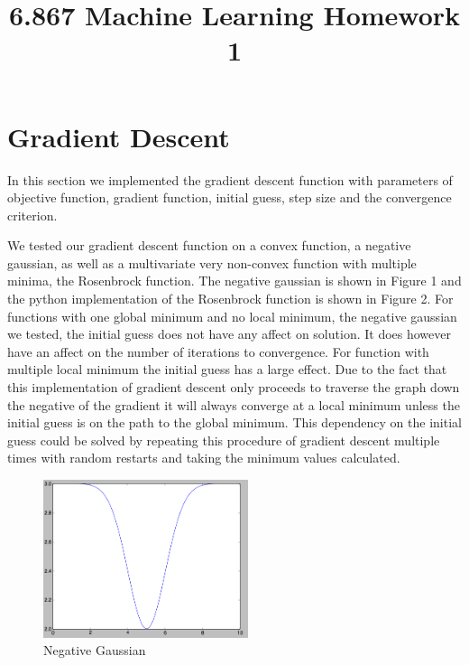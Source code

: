 \documentclass[pageno]{jpaper}
\begin{document}
\title{6.867 Machine Learning Homework 1}

\date{}
\maketitle

\thispagestyle{empty}


\section{Gradient Descent}

In this section we implemented the gradient descent function with parameters of objective function, gradient function, initial guess, step size and the convergence criterion.

We tested our gradient descent function on a convex function, a negative gaussian, as well as a multivariate very non-convex function with multiple minima, the Rosenbrock function. The negative gaussian is shown in Figure 1 and the python implementation of the Rosenbrock function is shown in Figure 2.
For functions with one global minimum and no local minimum, the negative gaussian we tested, the initial guess does not have any affect on solution. It does however have an affect on the number of iterations to convergence. For function with multiple local minimum the initial guess has a large effect.  Due to the fact that this implementation of gradient descent only proceeds to traverse the graph down the negative of the gradient it will always converge at a local minimum unless the initial guess is on the path to the global minimum. This dependency on the initial guess could be solved by repeating this procedure of gradient descent multiple times with random restarts and taking the minimum values calculated. 


\begin{figure}[ht!]
\centering
\includegraphics[width=60mm]{negative_gaussian}
\caption{Negative Gaussian}
\label{overflow}
\end{figure}
\end{document}
